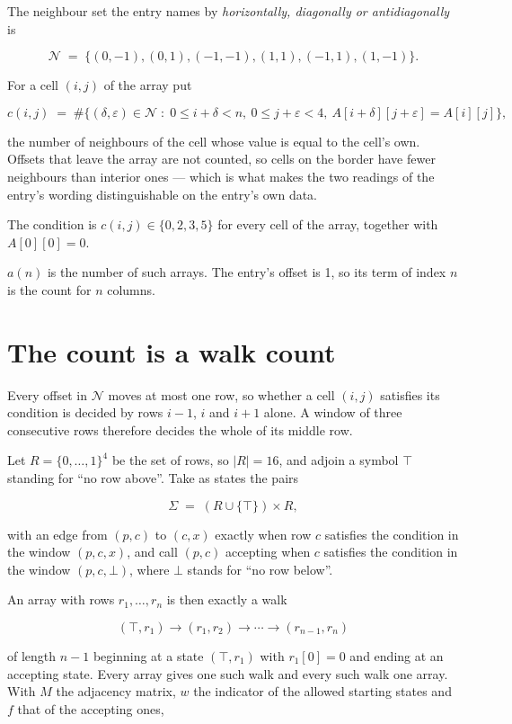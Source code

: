 \documentclass[11pt]{article}
\theoremstyle{definition}
\begin{document}
The neighbour set the entry names by {\itshape horizontally, diagonally or antidiagonally} is

\[\mathcal{N} \;=\; \{(0,-1), (0,1), (-1,-1), (1,1), (-1,1), (1,-1)\}.\]

For a cell $(i,j)$ of the array put

\[c(i,j) \;=\; \#\bigl\{(\delta,\varepsilon)\in\mathcal{N} \;:\; 0\le i+\delta<n,\ 0\le j+\varepsilon<4,\ A[i+\delta][j+\varepsilon] = A[i][j]\bigr\},\]

the number of neighbours of the cell whose value is equal to the cell's own. Offsets that leave the array are not counted, so cells on the border have fewer neighbours than interior ones --- which is what makes the two readings of the entry's wording distinguishable on the entry's own data.

The condition is $c(i,j) \in \{0, 2, 3, 5\}$ for every cell of the array, together with $A[0][0]=0$.

$a(n)$ is the number of such arrays. The entry's offset is 1, so its term of index $n$ is the count for $n$ columns.

\section{The count is a walk count}

Every offset in $\mathcal{N}$ moves at most one row, so whether a cell $(i,j)$ satisfies its condition is decided by rows $i-1$, $i$ and $i+1$ alone. A window of three consecutive rows therefore decides the whole of its middle row.

Let $R = \{0,\dots,1\}^{4}$ be the set of rows, so $|R| = 16$, and adjoin a symbol $\top$ standing for ``no row above''. Take as states the pairs

\[\Sigma \;=\; (R \cup \{\top\}) \times R,\]

with an edge from $(p,c)$ to $(c,x)$ exactly when row $c$ satisfies the condition in the window $(p,c,x)$, and call $(p,c)$ accepting when $c$ satisfies the condition in the window $(p,c,\bot)$, where $\bot$ stands for ``no row below''.

An array with rows $r_1,\dots,r_n$ is then exactly a walk

\[(\top,r_1) \to (r_1,r_2) \to \cdots \to (r_{n-1},r_n)\]

of length $n-1$ beginning at a state $(\top,r_1)$ with $r_1[0]=0$ and ending at an accepting state. Every array gives one such walk and every such walk one array. With $M$ the adjacency matrix, $w$ the indicator of the allowed starting states and $f$ that of the accepting ones,
\end{document}
